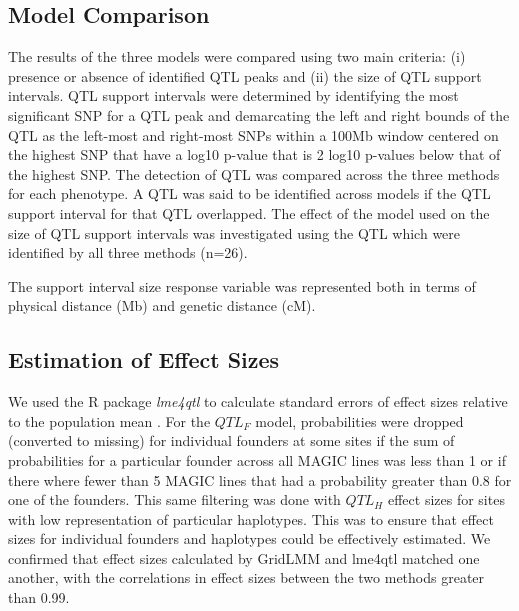\documentclass[article,9pt,twocolumn,twoside]{rilabRxiv}
\newcommand{\jri}[1]{{\small \textcolor{red}{#1}}}
\begin{document}
\subsection{Model Comparison}
The results of the three models were compared using two main criteria: (i) presence or absence of identified QTL peaks and (ii) the size of QTL support intervals.
QTL support intervals were determined by identifying the most significant SNP for a QTL peak and demarcating the left and right bounds of the QTL as the left-most and right-most SNPs within a 100Mb window centered on the highest SNP that have a log10 p-value that is 2 log10 p-values below that of the highest SNP.
The detection of QTL was compared across the three methods for each phenotype.
A QTL was said to be identified across models if the QTL support interval for that QTL overlapped.
The effect of the model used on the size of QTL support intervals was investigated using the QTL which were identified by all three methods (n=26).  %

The support interval size response variable was represented both in terms of physical distance (Mb) and genetic distance (cM).

\subsection{Estimation of Effect Sizes}
We used the R package \emph{lme4qtl} to calculate standard errors of effect sizes relative to the population mean \citep{Ziyatdinov}.
For the $QTL_F$ model, probabilities were dropped (converted to missing) for individual founders at some sites if the sum of probabilities for a particular founder across all MAGIC lines was less than 1 or if there where fewer than 5 MAGIC lines that had a probability greater than 0.8 for one of the founders.
This same filtering was done with $QTL_H$ effect sizes for sites with low representation of particular haplotypes.
This was to ensure that effect sizes for individual founders and haplotypes could be effectively estimated.
We confirmed that effect sizes calculated by GridLMM and lme4qtl matched one another, with the correlations in effect sizes between the two methods greater than 0.99.
\end{document}
